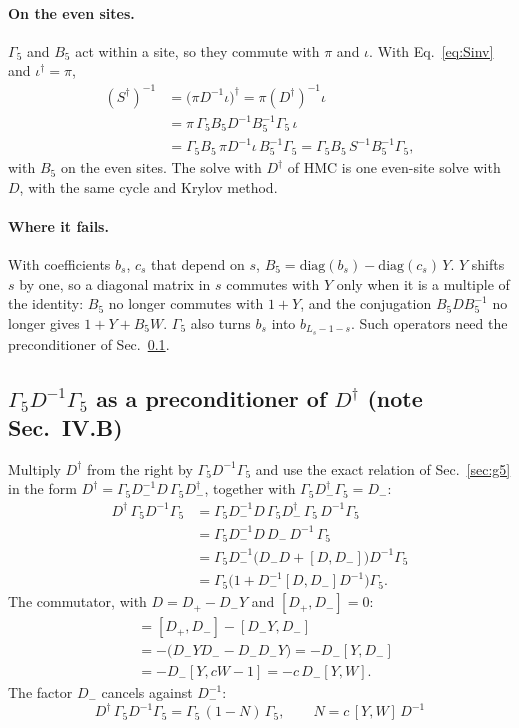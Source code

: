 \documentclass[11pt,a4paper]{article}
\numberwithin{equation}{section}
\newcommand{\dg}{^{\dagger}}
\newcommand{\Gfive}{\Gamma_5}
\begin{document}
\paragraph{On the even sites.} $\Gfive$ and $B_5$ act within a site, so they commute with $\pi$
and $\iota$. With Eq.~\eqref{eq:Sinv} and $\iota\dg=\pi$,
\begin{align}
(S\dg)^{-1}&=\big(\pi D^{-1}\iota\big)\dg=\pi(D\dg)^{-1}\iota\nonumber\\
&=\pi\,\Gfive B_5D^{-1}B_5^{-1}\Gfive\,\iota\nonumber\\
&=\Gfive B_5\,\pi D^{-1}\iota\,B_5^{-1}\Gfive=\Gfive B_5\,S^{-1}B_5^{-1}\Gfive ,
\end{align}
with $B_5$ on the even sites. The solve with $D\dg$ of HMC is one even-site solve with $D$, with
the same cycle and Krylov method.

\paragraph{Where it fails.} With coefficients $b_s$, $c_s$ that depend on $s$,
$B_5=\mathrm{diag}(b_s)-\mathrm{diag}(c_s)\,Y$. $Y$ shifts $s$ by one, so a diagonal matrix in $s$
commutes with $Y$ only when it is a multiple of the identity: $B_5$ no longer commutes with $1+Y$,
and the conjugation $B_5DB_5^{-1}$ no longer gives $1+Y+B_5W$. $\Gfive$ also turns $b_s$ into
$b_{L_s-1-s}$. Such operators need the preconditioner of
Sec.~\ref{sec:c4}.

\subsection{$\Gfive D^{-1}\Gfive$ as a preconditioner of $D\dg$ (note Sec.~IV.B)}
\label{sec:c4}
Multiply $D\dg$ from the right by $\Gfive D^{-1}\Gfive$ and use the exact relation of Sec.~\ref{sec:g5} in the form
$D\dg=\Gfive D_-^{-1}D\,\Gfive D_-\dg$, together with $\Gfive D_-\dg\Gfive=D_-$:
\begin{align}
D\dg\,\Gfive D^{-1}\Gfive&=\Gfive D_-^{-1}D\,\Gfive D_-\dg\,\Gfive\,D^{-1}\Gfive\nonumber\\
&=\Gfive D_-^{-1}D\,D_-\,D^{-1}\,\Gfive\nonumber\\
&=\Gfive D_-^{-1}\big(D_-D+[D,D_-]\big)D^{-1}\Gfive\nonumber\\
&=\Gfive\big(1+D_-^{-1}[D,D_-]D^{-1}\big)\Gfive .
\end{align}
The commutator, with $D=D_+-D_-Y$ and $[D_+,D_-]=0$:
\begin{align}
[D,D_-]&=[D_+,D_-]-[D_-Y,D_-]\nonumber\\
&=-\big(D_-YD_--D_-D_-Y\big)=-D_-[Y,D_-]\nonumber\\
&=-D_-[Y,cW-1]=-c\,D_-[Y,W] .
\end{align}
The factor $D_-$ cancels against $D_-^{-1}$:
\begin{equation}
\boxed{\;D\dg\,\Gfive D^{-1}\Gfive=\Gfive\,(1-N)\,\Gfive,\qquad N=c\,[Y,W]\,D^{-1}\;}
\end{equation}
\end{document}
